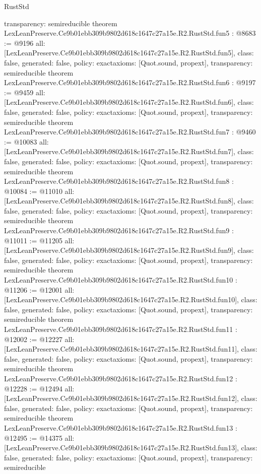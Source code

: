 \begin{lexlean}{RustStd}
\begin{coremodule}
{  transparency: semireducible
}
theorem LexLeanPreserve.Ce9b01ebb309b9802d618c1647c27a15e.R2.RustStd.fun5 : @8683 := @9196 {
  all: [LexLeanPreserve.Ce9b01ebb309b9802d618c1647c27a15e.R2.RustStd.fun5],
  class: false,
  generated: false,
  policy: exact{axioms: [Quot.sound, propext]},
  transparency: semireducible
}
theorem LexLeanPreserve.Ce9b01ebb309b9802d618c1647c27a15e.R2.RustStd.fun6 : @9197 := @9459 {
  all: [LexLeanPreserve.Ce9b01ebb309b9802d618c1647c27a15e.R2.RustStd.fun6],
  class: false,
  generated: false,
  policy: exact{axioms: [Quot.sound, propext]},
  transparency: semireducible
}
theorem LexLeanPreserve.Ce9b01ebb309b9802d618c1647c27a15e.R2.RustStd.fun7 : @9460 := @10083 {
  all: [LexLeanPreserve.Ce9b01ebb309b9802d618c1647c27a15e.R2.RustStd.fun7],
  class: false,
  generated: false,
  policy: exact{axioms: [Quot.sound, propext]},
  transparency: semireducible
}
theorem LexLeanPreserve.Ce9b01ebb309b9802d618c1647c27a15e.R2.RustStd.fun8 : @10084 := @11010 {
  all: [LexLeanPreserve.Ce9b01ebb309b9802d618c1647c27a15e.R2.RustStd.fun8],
  class: false,
  generated: false,
  policy: exact{axioms: [Quot.sound, propext]},
  transparency: semireducible
}
theorem LexLeanPreserve.Ce9b01ebb309b9802d618c1647c27a15e.R2.RustStd.fun9 : @11011 := @11205 {
  all: [LexLeanPreserve.Ce9b01ebb309b9802d618c1647c27a15e.R2.RustStd.fun9],
  class: false,
  generated: false,
  policy: exact{axioms: [Quot.sound, propext]},
  transparency: semireducible
}
theorem LexLeanPreserve.Ce9b01ebb309b9802d618c1647c27a15e.R2.RustStd.fun10 : @11206 := @12001 {
  all: [LexLeanPreserve.Ce9b01ebb309b9802d618c1647c27a15e.R2.RustStd.fun10],
  class: false,
  generated: false,
  policy: exact{axioms: [Quot.sound, propext]},
  transparency: semireducible
}
theorem LexLeanPreserve.Ce9b01ebb309b9802d618c1647c27a15e.R2.RustStd.fun11 : @12002 := @12227 {
  all: [LexLeanPreserve.Ce9b01ebb309b9802d618c1647c27a15e.R2.RustStd.fun11],
  class: false,
  generated: false,
  policy: exact{axioms: [Quot.sound, propext]},
  transparency: semireducible
}
theorem LexLeanPreserve.Ce9b01ebb309b9802d618c1647c27a15e.R2.RustStd.fun12 : @12228 := @12494 {
  all: [LexLeanPreserve.Ce9b01ebb309b9802d618c1647c27a15e.R2.RustStd.fun12],
  class: false,
  generated: false,
  policy: exact{axioms: [Quot.sound, propext]},
  transparency: semireducible
}
theorem LexLeanPreserve.Ce9b01ebb309b9802d618c1647c27a15e.R2.RustStd.fun13 : @12495 := @14375 {
  all: [LexLeanPreserve.Ce9b01ebb309b9802d618c1647c27a15e.R2.RustStd.fun13],
  class: false,
  generated: false,
  policy: exact{axioms: [Quot.sound, propext]},
  transparency: semireducible
}
\end{coremodule}
\end{lexlean}
